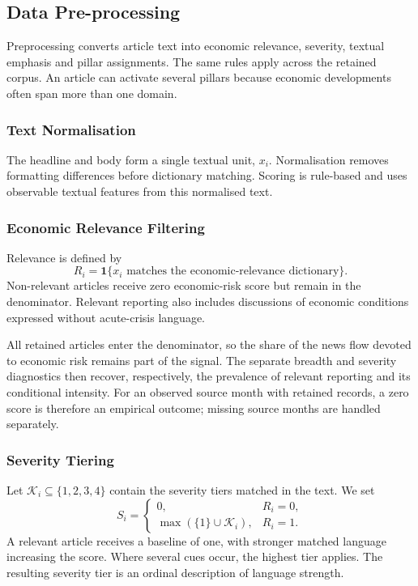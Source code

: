 \documentclass[12pt]{article}
\newcommand{\ind}{\mathbf{1}}
\begin{document}
\subsection{Data Pre-processing}\label{sec:preprocessing}
Preprocessing converts article text into economic relevance, severity, textual emphasis and pillar assignments. The same rules apply across the retained corpus. An article can activate several pillars because economic developments often span more than one domain.
\subsubsection{Text Normalisation}\label{sec:text_norm}
The headline and body form a single textual unit, $x_i$. Normalisation removes formatting differences before dictionary matching. Scoring is rule-based and uses observable textual features from this normalised text.
\subsubsection{Economic Relevance Filtering}\label{sec:relevance_filter}
Relevance is defined by
\begin{equation}R_i=\ind\{x_i\text{ matches the economic-relevance dictionary}\}.\label{eq:relevance}\end{equation}
Non-relevant articles receive zero economic-risk score but remain in the denominator. Relevant reporting also includes discussions of economic conditions expressed without acute-crisis language.

All retained articles enter the denominator, so the share of the news flow devoted to economic risk remains part of the signal. The separate breadth and severity diagnostics then recover, respectively, the prevalence of relevant reporting and its conditional intensity. For an observed source month with retained records, a zero score is therefore an empirical outcome; missing source months are handled separately.
\subsubsection{Severity Tiering}\label{sec:severity_tiering}
Let $\mathcal K_i\subseteq\{1,2,3,4\}$ contain the severity tiers matched in the text. We set
\begin{equation} S_i=\begin{cases}0,&R_i=0,\\ \max(\{1\}\cup\mathcal K_i),&R_i=1.\end{cases}\label{eq:severity}\end{equation}
A relevant article receives a baseline of one, with stronger matched language increasing the score. Where several cues occur, the highest tier applies. The resulting severity tier is an ordinal description of language strength.
\end{document}
